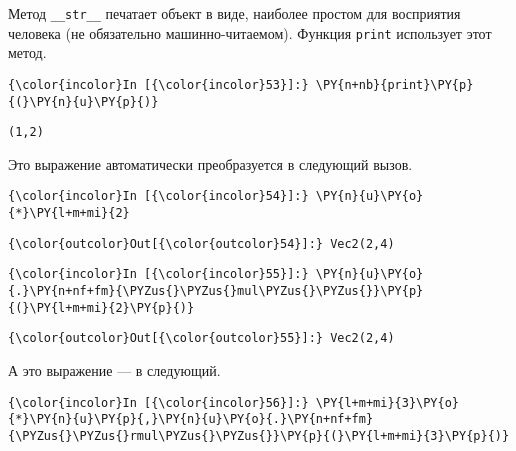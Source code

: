     Метод \texttt{\_\_str\_\_} печатает объект в виде, наиболее простом для
восприятия человека (не обязательно машинно-читаемом). Функция
\texttt{print} использует этот метод.

    \begin{Verbatim}[commandchars=\\\{\}]
{\color{incolor}In [{\color{incolor}53}]:} \PY{n+nb}{print}\PY{p}{(}\PY{n}{u}\PY{p}{)}
\end{Verbatim}

    \begin{Verbatim}[commandchars=\\\{\}]
(1,2)

    \end{Verbatim}

    Это выражение автоматически преобразуется в следующий вызов.

    \begin{Verbatim}[commandchars=\\\{\}]
{\color{incolor}In [{\color{incolor}54}]:} \PY{n}{u}\PY{o}{*}\PY{l+m+mi}{2}
\end{Verbatim}

            \begin{Verbatim}[commandchars=\\\{\}]
{\color{outcolor}Out[{\color{outcolor}54}]:} Vec2(2,4)
\end{Verbatim}
        
    \begin{Verbatim}[commandchars=\\\{\}]
{\color{incolor}In [{\color{incolor}55}]:} \PY{n}{u}\PY{o}{.}\PY{n+nf+fm}{\PYZus{}\PYZus{}mul\PYZus{}\PYZus{}}\PY{p}{(}\PY{l+m+mi}{2}\PY{p}{)}
\end{Verbatim}

            \begin{Verbatim}[commandchars=\\\{\}]
{\color{outcolor}Out[{\color{outcolor}55}]:} Vec2(2,4)
\end{Verbatim}
        
    А это выражение --- в следующий.

    \begin{Verbatim}[commandchars=\\\{\}]
{\color{incolor}In [{\color{incolor}56}]:} \PY{l+m+mi}{3}\PY{o}{*}\PY{n}{u}\PY{p}{,}\PY{n}{u}\PY{o}{.}\PY{n+nf+fm}{\PYZus{}\PYZus{}rmul\PYZus{}\PYZus{}}\PY{p}{(}\PY{l+m+mi}{3}\PY{p}{)}
\end{Verbatim}

